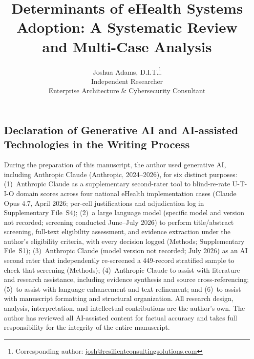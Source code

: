 \documentclass[12pt]{article}
\title{Determinants of eHealth Systems Adoption: A Systematic Review and Multi-Case Analysis}
\author{Joshua Adams, D.I.T.\orcidlink{0000-0002-7185-9125}\thanks{Corresponding author: \href{mailto:josh@resilientconsultingsolutions.com}{josh@resilientconsultingsolutions.com}} \\
  Independent Researcher \\
  Enterprise Architecture \& Cybersecurity Consultant}
\date{}
\begin{document}
\maketitle

























\newpage
\subsection*{Declaration of Generative AI and AI-assisted Technologies in the Writing Process}

During the preparation of this manuscript, the author used generative AI, including Anthropic Claude (Anthropic, 2024--2026), for six distinct purposes: (1)~Anthropic Claude as a supplementary second-rater tool to blind-re-rate U-T-I-O domain scores across four national eHealth implementation cases (Claude Opus 4.7, April 2026; per-cell justifications and adjudication log in Supplementary File~S4); (2)~a large language model (specific model and version not recorded; screening conducted June--July 2026) to perform title/abstract screening, full-text eligibility assessment, and evidence extraction under the author's eligibility criteria, with every decision logged (Methods; Supplementary File~S1); (3)~Anthropic Claude (model version not recorded; July 2026) as an AI second rater that independently re-screened a 449-record stratified sample to check that screening (Methods); (4)~Anthropic Claude to assist with literature and research assistance, including evidence synthesis and source cross-referencing; (5)~to assist with language enhancement and text refinement; and (6)~to assist with manuscript formatting and structural organization. All research design, analysis, interpretation, and intellectual contributions are the author's own. The author has reviewed all AI-assisted content for factual accuracy and takes full responsibility for the integrity of the entire manuscript.
\end{document}
